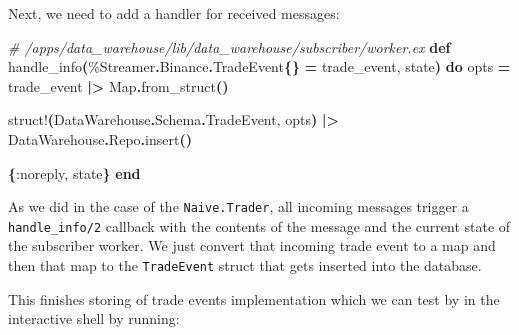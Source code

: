 \documentclass[
  oneside]{book}
\newenvironment{Shaded}{\begin{snugshade}}{\end{snugshade}}
\newcommand{\AttributeTok}[1]{\textcolor[rgb]{0.13,0.29,0.53}{#1}}
\newcommand{\CommentTok}[1]{\textcolor[rgb]{0.56,0.35,0.01}{\textit{#1}}}
\newcommand{\ConstantTok}[1]{\textcolor[rgb]{0.56,0.35,0.01}{#1}}
\newcommand{\ErrorTok}[1]{\textcolor[rgb]{0.64,0.00,0.00}{\textbf{#1}}}
\newcommand{\ExtensionTok}[1]{#1}
\newcommand{\FunctionTok}[1]{\textcolor[rgb]{0.13,0.29,0.53}{\textbf{#1}}}
\newcommand{\KeywordTok}[1]{\textcolor[rgb]{0.13,0.29,0.53}{\textbf{#1}}}
\newcommand{\NormalTok}[1]{#1}
\newcommand{\OperatorTok}[1]{\textcolor[rgb]{0.81,0.36,0.00}{\textbf{#1}}}
\newcommand{\PreprocessorTok}[1]{\textcolor[rgb]{0.56,0.35,0.01}{\textit{#1}}}
\newcommand{\SpecialStringTok}[1]{\textcolor[rgb]{0.31,0.60,0.02}{#1}}
\newcommand{\StringTok}[1]{\textcolor[rgb]{0.31,0.60,0.02}{#1}}
\newcommand{\VariableTok}[1]{\textcolor[rgb]{0.00,0.00,0.00}{#1}}
\begin{document}
\newpage

Next, we need to add a handler for received messages:

\begin{Shaded}
\begin{Highlighting}[]
\CommentTok{\# /apps/data\_warehouse/lib/data\_warehouse/subscriber/worker.ex}
  \KeywordTok{def}\NormalTok{ handle\_info}\FunctionTok{(}\NormalTok{\%}\ConstantTok{Streamer}\OperatorTok{.}\ConstantTok{Binance}\OperatorTok{.}\ConstantTok{TradeEvent}\FunctionTok{\{\}} \OperatorTok{=}\NormalTok{ trade\_event, state}\FunctionTok{)} \KeywordTok{do}
\NormalTok{    opts }\OperatorTok{=}
\NormalTok{      trade\_event}
      \OperatorTok{|\textgreater{}} \ConstantTok{Map}\OperatorTok{.}\NormalTok{from\_struct}\FunctionTok{()}

\NormalTok{    struct!}\FunctionTok{(}\ConstantTok{DataWarehouse}\OperatorTok{.}\ConstantTok{Schema}\OperatorTok{.}\ConstantTok{TradeEvent}\NormalTok{, opts}\FunctionTok{)}
    \OperatorTok{|\textgreater{}} \ConstantTok{DataWarehouse}\OperatorTok{.}\ConstantTok{Repo}\OperatorTok{.}\NormalTok{insert}\FunctionTok{()}

    \FunctionTok{\{}\VariableTok{:noreply}\NormalTok{, state}\FunctionTok{\}}
  \KeywordTok{end}
\end{Highlighting}
\end{Shaded}

As we did in the case of the \texttt{Naive.Trader}, all incoming messages trigger a \texttt{handle\_info/2} callback with the contents of the message and the current state of the subscriber worker. We just convert that incoming trade event to a map and then that map to the \texttt{TradeEvent} struct that gets inserted into the database.

This finishes storing of trade events implementation which we can test by in the interactive shell by running:

\begin{Shaded}
\end{Shaded}
\end{document}
